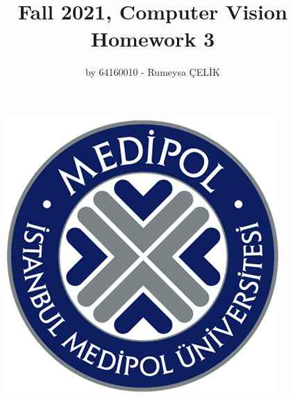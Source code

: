 \documentclass[a4paper, 12pt]{report}
\begin{document}
\begin{figure}
\includegraphics[scale=.63]{medipol.png}
\centering
\end{figure}
\begin{titlepage}
\title{Fall 2021, Computer Vision \\ Homework 3}
\author{by 64160010 - Rumeysa ÇELİK}
\maketitle
\end{titlepage}
\end{document}
